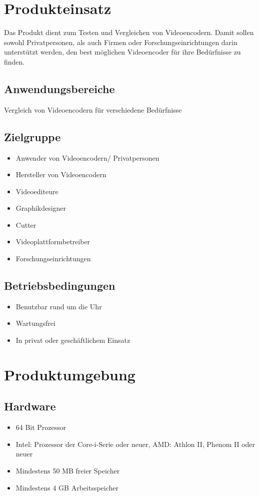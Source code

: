 \documentclass[parskip=full]{scrartcl}
\begin{document}
\section{Produkteinsatz}
Das Produkt dient zum Testen und Vergleichen von Videoencodern. 
Damit sollen sowohl Privatpersonen, als auch Firmen oder Forschungseinrichtungen darin unterstützt werden, den best möglichen Videoencoder für ihre Bedürfnisse zu finden.
\subsection{Anwendungsbereiche}
Vergleich von Videoencodern für verschiedene Bedürfnisse
\subsection{Zielgruppe}
\begin{itemize}
\item Anwender von Videoencodern/ Privatpersonen
\item Hersteller von Videoencodern
\item Videoediteure
\item Graphikdesigner
\item Cutter
\item Videoplattformbetreiber
\item Forschungseinrichtungen
\end{itemize}
\subsection{Betriebsbedingungen}
\begin{itemize}
\item Benutzbar rund um die Uhr
\item Wartungsfrei
\item In privat oder geschäftlichem Einsatz
\end{itemize}
\newpage
\section{Produktumgebung}

\subsection{Hardware}
\begin{itemize}
\item 64 Bit Prozessor
\item Intel: Prozessor der Core-i-Serie oder neuer, AMD: Athlon II, Phenom II oder neuer
\item Mindestens 50 MB freier Speicher
\item Mindestens 4 GB Arbeitsspeicher
\end{itemize}
\end{document}
